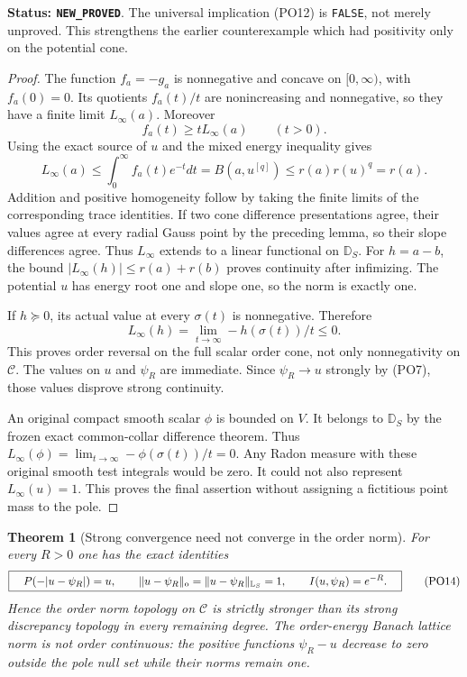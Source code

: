 \documentclass[11pt,a4paper]{article}
\numberwithin{equation}{section}
\newtheorem{theorem}{Theorem}[section]
\theoremstyle{definition}
\theoremstyle{remark}
\begin{document}
\noindent\textbf{Status: \texttt{NEW\_PROVED}}.  The
universal implication \textup{(PO12)} is \texttt{FALSE},
not merely unproved.  This strengthens the earlier
counterexample which had positivity only on the
potential cone.

\begin{proof}
The function $f_a=-g_a$ is nonnegative and concave on
$[0,\infty)$, with $f_a(0)=0$.  Its quotients
$f_a(t)/t$ are nonincreasing and nonnegative, so they
have a finite limit $L_\infty(a)$.  Moreover
\[
                    f_a(t)\ge tL_\infty(a)\qquad(t>0).
\]
Using the exact source of $u$ and the mixed energy
inequality gives
\[
 L_\infty(a)
  \le\int_0^\infty f_a(t)e^{-t}dt
  =B(a,u^{[q]})\le r(a)r(u)^q=r(a).
 \tag{PO13}
\]
Addition and positive homogeneity follow by taking the
finite limits of the corresponding trace identities.
If two cone difference presentations agree, their
values agree at every radial Gauss point by the
preceding lemma, so their slope differences agree.
Thus $L_\infty$ extends to a linear functional on
$\mathbb D_S$.  For $h=a-b$, the bound
$|L_\infty(h)|\le r(a)+r(b)$ proves continuity after
infimizing.  The potential $u$ has energy root one and
slope one, so the norm is exactly one.

If $h\succeq0$, its actual value at every $\sigma(t)$
is nonnegative.  Therefore
\[ L_\infty(h)=\lim_{t\to\infty}-h(\sigma(t))/t\le0. \]
This proves order reversal on the full scalar order
cone, not only nonnegativity on $\mathscr C$.
The values on $u$ and $\psi_R$ are immediate.  Since
$\psi_R\to u$ strongly by \textup{(PO7)}, those
values disprove strong continuity.

An original compact smooth scalar $\phi$ is bounded
on $V$.  It belongs to $\mathbb D_S$ by the frozen
exact common-collar difference theorem.  Thus
$L_\infty(\phi)=\lim_{t\to\infty}-\phi(\sigma(t))/t=0$.
Any Radon measure with these original smooth test
integrals would be zero.  It could not also represent
$L_\infty(u)=1$.  This proves the final assertion
without assigning a fictitious point mass to the pole.
\end{proof}

\begin{theorem}[Strong convergence need not converge in the order norm]
\label{thm:r12-strong-not-order-topology}
For every $R>0$ one has the exact identities
\[
 \boxed{\quad
 P(-|u-\psi_R|)=u,
       \qquad\|u-\psi_R\|_{\rm o}
              =\|u-\psi_R\|_{\mathbb L_S}=1,
       \qquad I(u,\psi_R)=e^{-R}.
 \quad}
 \tag{PO14}
\]
Hence the order norm topology on $\mathscr C$ is
strictly stronger than its strong discrepancy topology
in every remaining degree.  The order-energy Banach
lattice norm is not order continuous: the positive
functions $\psi_R-u$ decrease to zero outside the pole
null set while their norms remain one.
\end{theorem}
\end{document}
